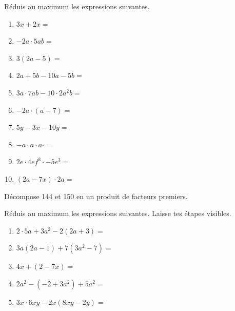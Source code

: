 \documentclass[12pt,parskip=half-, twoside=semi]{scrartcl}
\begin{document}
\newpage
\begin{exercise}[points=10]
    Réduis au maximum les expressions suivantes.
    \begin{enumerate}[cols=2, itemsep=2cm]
        \item \(3x + 2x =\)
        \item \(-2a \cdot 5ab = \)
        \item \(3(2a - 5)=\)
        \item \(2a + 5b - 10a - 5b=\)
        \item \(3a \cdot 7ab - 10 \cdot 2a^2b=\)
        \item \(-2a \cdot (a-7)=\)
        \item \(5y - 3x - 10y =\)
        \item \(-a \cdot a \cdot a \cdot =\)
        \item \(2e \cdot 4ef^3 \cdot -5e^3 = \)
        \item \((2a - 7x) \cdot 2a=\)
    \end{enumerate}
\end{exercise}
\vfil
\begin{exercise}[points=2]
	Décompose 144 et 150 en un produit de facteurs premiers.
\end{exercise}

\newpage
\begin{exercise}[points=5]
    Réduis au maximum les expressions suivantes. Laisse tes étapes visibles.
    \begin{enumerate}[itemsep=4cm]
        \item \(2\cdot 5a + 3a^2 - 2(2a+3)=\)
        \item \(3a(2a-1) + 7(3a^2 - 7)=\)
        \item \(4x + (2 - 7x) = \)
        \item \(2a^2 - (-2 + 3a^2) + 5a^2 =\)
        \item \(3x \cdot 6xy - 2x (8xy - 2y)=\)
    \end{enumerate}
\end{exercise}
\end{document}
